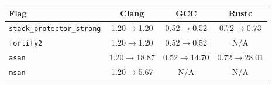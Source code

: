 \begin{tabular*}{\columnwidth}{@{\extracolsep\fill}lccc@{\extracolsep\fill}}
\toprule
\textbf{Flag} & \textbf{Clang} & \textbf{GCC} & \textbf{Rustc} \\
\midrule
\texttt{stack\_protector\_strong} & 1.20$\to$1.20 & 0.52$\to$0.52 & 0.72$\to$0.73 \\
\texttt{fortify2} & 1.20$\to$1.20 & 0.52$\to$0.52 & N/A \\
\texttt{asan} & 1.20$\to$18.87 & 0.52$\to$14.70 & 0.72$\to$28.01 \\
\texttt{msan} & 1.20$\to$5.67 & N/A & N/A \\
\bottomrule
\end{tabular*}
